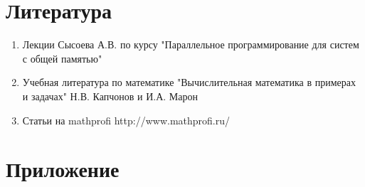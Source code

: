 \documentclass{report}
\begin{document}
\newpage

\section*{Литература}
\begin{enumerate}
    \item Лекции Сысоева А.В. по курсу "Параллельное программирование для систем с общей памятью"
    \item Учебная литература по математике "Вычислительная математика в примерах и задачах" \space Н.В. Капчонов и И.А. Марон
    \item Статьи на mathprofi \newline 
    http://www.mathprofi.ru/
\end{enumerate}


\newpage

\section*{Приложение}
\end{document}
